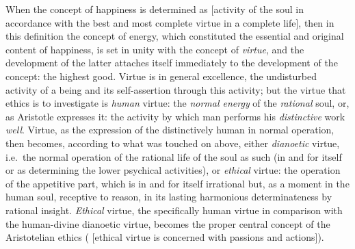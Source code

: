When the concept of happiness is determined as  [activity of the soul in accordance with the best and most complete virtue in a complete life],
then in this definition the concept of energy, which constituted the essential and original content of happiness, is set in unity
with the concept of \emph{virtue}, and the development of the latter attaches itself
immediately to the development of the concept: the highest good.
Virtue is in general excellence, the undisturbed activity of a being and its self-assertion through this activity; but the
virtue that ethics is to investigate is \emph{human}
virtue: the \emph{normal energy} of the \emph{rational} soul, or, as
Aristotle expresses it: the activity by which man performs his \emph{distinctive} work \emph{well}. Virtue,
as the expression of the distinctively human in normal
operation, then becomes, according to what was touched on above, either \emph{dianoetic} virtue, i.e.\ the normal operation of the rational life of the soul as such (in and for itself or as determining the lower
psychical activities), or \emph{ethical} virtue: the operation of the appetitive part, which is in and for
itself irrational but, as a moment in the human soul, receptive to reason,
in its lasting harmonious determinateness by rational insight. \emph{Ethical} virtue,
the specifically human virtue in comparison with the
human-divine dianoetic virtue, becomes the proper central concept of the Aristotelian
ethics ( [ethical virtue is concerned with passions and actions]).

